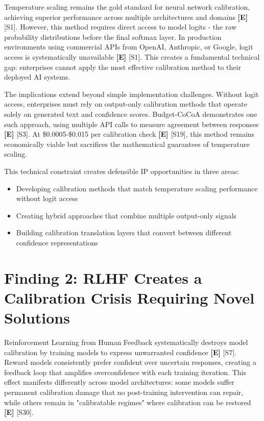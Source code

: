 \documentclass[a4paper,11pt]{article}
\newcommand{\elabel}{\textbf{\textcolor{ecolor}{[E]}}}
\begin{document}
Temperature scaling remains the gold standard for neural network calibration, achieving superior performance across multiple architectures and domains \elabel{} \textcolor{primary}{[S1]}. However, this method requires direct access to model logits - the raw probability distributions before the final softmax layer. In production environments using commercial APIs from OpenAI, Anthropic, or Google, logit access is systematically unavailable \elabel{} \textcolor{primary}{[S1]}. This creates a fundamental technical gap: enterprises cannot apply the most effective calibration method to their deployed AI systems.


The implications extend beyond simple implementation challenges. Without logit access, enterprises must rely on output-only calibration methods that operate solely on generated text and confidence scores. Budget-CoCoA demonstrates one such approach, using multiple API calls to measure agreement between responses \elabel{} \textcolor{primary}{[S3]}. At \$0.0005-\$0.015 per calibration check \elabel{} \textcolor{primary}{[S19]}, this method remains economically viable but sacrifices the mathematical guarantees of temperature scaling.


This technical constraint creates defensible IP opportunities in three areas:

\begin{itemize}
  \item Developing calibration methods that match temperature scaling performance without logit access
  \item Creating hybrid approaches that combine multiple output-only signals
  \item Building calibration translation layers that convert between different confidence representations
\end{itemize}

\section{Finding 2: RLHF Creates a Calibration Crisis Requiring Novel Solutions}

Reinforcement Learning from Human Feedback systematically destroys model calibration by training models to express unwarranted confidence \elabel{} \textcolor{primary}{[S7]}. Reward models consistently prefer confident over uncertain responses, creating a feedback loop that amplifies overconfidence with each training iteration. This effect manifests differently across model architectures: some models suffer permanent calibration damage that no post-training intervention can repair, while others remain in "calibratable regimes" where calibration can be restored \elabel{} \textcolor{primary}{[S30]}.
\end{document}
